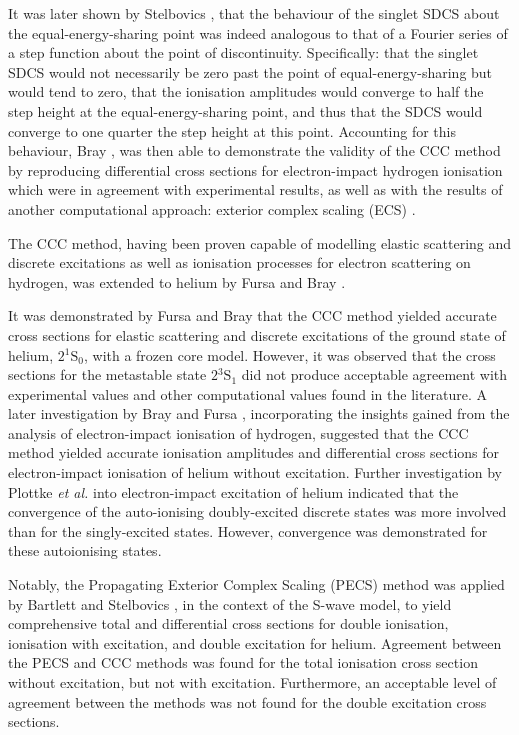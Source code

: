 \documentclass[]{article}
\begin{document}
It was later shown by Stelbovics \cite{PhysRevLett.83.1570}, that the behaviour
of the singlet SDCS about the equal-energy-sharing point was indeed analogous to
that of a Fourier series of a step function about the point of discontinuity.
Specifically: that the singlet SDCS would not necessarily be zero past the point
of equal-energy-sharing but would tend to zero, that the ionisation amplitudes
would converge to half the step height at the equal-energy-sharing point, and
thus that the SDCS would converge to one quarter the step height at this point.
Accounting for this behaviour, Bray \cite{PhysRevLett.89.273201}, was then able
to demonstrate the validity of the CCC method by reproducing differential cross
sections for electron-impact hydrogen ionisation which were in agreement with
experimental results, as well as with the results of another computational
approach: exterior complex scaling (ECS) \cite{PhysRevA.64.022709}.

The CCC method, having been proven capable of modelling elastic scattering and
discrete excitations \cite{PhysRevA.46.6995} as well as ionisation processes
\cite{PhysRevLett.70.746, PhysRevLett.78.4721, PhysRevLett.83.1570} for
electron scattering on hydrogen, was extended to helium by Fursa and Bray
\cite{PhysRevA.52.1279, PhysRevLett.76.2674, Fursa_1997}.

It was demonstrated by Fursa and Bray \cite{Fursa_1997} that the CCC method
yielded accurate cross sections for elastic scattering and discrete excitations
of the ground state of helium, $2{}^{1}\mathrm{S}_{0}$, with a frozen core model.
However, it was observed that the cross sections for the metastable state
$2{}^{3}\mathrm{S}_{1}$ did not produce acceptable agreement with experimental
values and other computational values found in the literature.
A later investigation by Bray and Fursa \cite{PhysRevA.63.040702}, incorporating
the insights gained from the analysis of electron-impact ionisation of hydrogen,
suggested that the CCC method yielded accurate ionisation amplitudes and
differential cross sections for electron-impact ionisation of helium without
excitation.
Further investigation by Plottke \textit{et al.} \cite{Plottke_2004} into
electron-impact excitation of helium indicated that the convergence of the
auto-ionising doubly-excited discrete states was more involved than for the
singly-excited states.
However, convergence was demonstrated for these autoionising states.

Notably, the Propagating Exterior Complex Scaling (PECS) method was applied by
Bartlett and Stelbovics \cite{PhysRevA.81.022715, PhysRevA.81.022716}, in the
context of the S-wave model, to yield comprehensive total and differential cross
sections for double ionisation, ionisation with excitation, and double
excitation for helium.
Agreement between the PECS and CCC methods was found for the total ionisation
cross section without excitation, but not with excitation.
Furthermore, an acceptable level of agreement between the methods was not found
for the double excitation cross sections.
\end{document}
